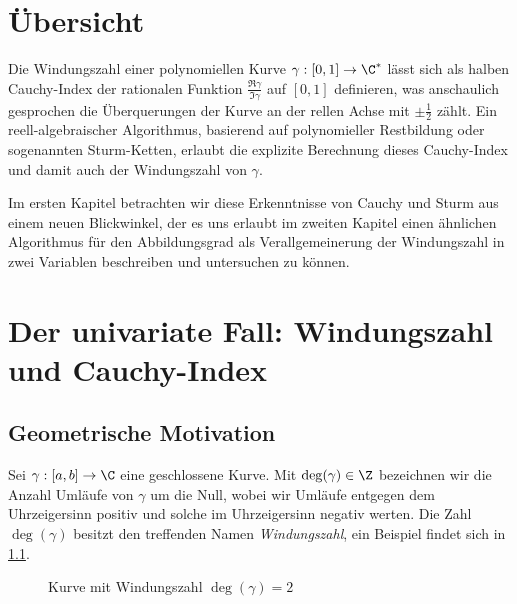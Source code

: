 \documentclass{mythesis}
\begin{document}
\chapter*{Übersicht}

Die Windungszahl einer polynomiellen Kurve $\gamma: [0, 1] \to \C^*$ lässt sich als halben Cauchy-Index der rationalen Funktion $\frac{\Re \gamma}{\Im \gamma}$ auf $[0,1]$ definieren, was anschaulich gesprochen die Überquerungen der Kurve an der rellen Achse mit $\pm \frac{1}{2}$ zählt.
Ein reell-algebraischer Algorithmus, basierend auf polynomieller Restbildung oder sogenannten Sturm-Ketten, erlaubt die explizite Berechnung dieses Cauchy-Index und damit auch der Windungszahl von $\gamma$.

Im ersten Kapitel betrachten wir diese Erkenntnisse von Cauchy und Sturm aus einem neuen Blickwinkel, der es uns erlaubt im zweiten Kapitel einen ähnlichen Algorithmus für den Abbildungsgrad als Verallgemeinerung der Windungszahl in zwei Variablen beschreiben und untersuchen zu können.


{
    \let\clearpage\relax
    \tableofcontents
}


\clearpage
\chapter{Der univariate Fall: Windungszahl und Cauchy-Index} \label{sec:1}

\section{Geometrische Motivation}

Sei $\gamma: [a,b] \to \C$ eine geschlossene Kurve.
Mit $\deg(\gamma) \in \Z$ bezeichnen wir die Anzahl Umläufe von $\gamma$ um die Null, wobei wir Umläufe entgegen dem Uhrzeigersinn positiv und solche im Uhrzeigersinn negativ werten.
Die Zahl $\deg(\gamma)$ besitzt den treffenden Namen \emph{Windungszahl}, ein Beispiel findet sich in \ref{fig:winding_number}.

\begin{figure}[ht]
    \centering
    \caption{Kurve mit Windungszahl $\deg(\gamma) = 2$}
    \label{fig:winding_number}
\end{figure}
\end{document}
